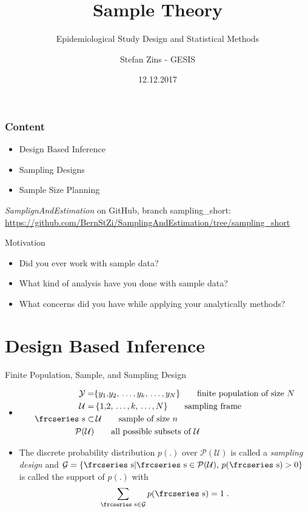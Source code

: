 \documentclass{beamer}\usepackage[]{graphicx}\usepackage[]{color}
\title{Sample Theory}
\subtitle{Epidemiological Study Design and Statistical Methods}
\author{Stefan Zins - GESIS}
\date{12.12.2017}
\newcommand{\eqname}[1]{\tag*{#1}} %
\newcommand{\textfrc}[1]{{\frcseries#1}}
\newcommand{\mathfrc}[1]{\text{\textfrc{#1}}}
\begin{document}
\gesismaketitle %

\begin{frame}%
  \frametitle{Content}
  
  \begin{itemize}
  \item Design Based Inference
  \item Sampling Designs
  \item Sample Size Planning
  \end{itemize}


\emph{SamplignAndEstimation} on GitHub, branch sampling\_short:
\url{https://github.com/BernStZi/SamplingAndEstimation/tree/sampling_short}
\end{frame}


\begin{frame}{Motivation}
 \begin{itemize}
    \item<1,4>  Did you ever work with sample data? 
    \item<2,4> What kind of analysis have you done with sample data?
    \item<3,4>  What concerns did you have while applying your analytically methods?
  \end{itemize}
\end{frame}



\section{Design Based Inference}



\begin{frame}{\alert{Finite} Population, Sample, and Sampling Design}

 \begin{itemize}
 \item[] 
 \begin{align}
 \mathcal{Y} = & \{ y_1{,}y_2{,}\,\ldots{,}\,y_k{,}\,\ldots{,}\,y_N \} \eqname{finite population of size $N$} \\
 \mathcal{U} = &\, \{ 1{,}2{,}\,\ldots{,}\,k{,}\,\ldots{,}\,N \} \eqname{sampling frame} \\
 \mathfrc{s} \subset &\, \mathcal{U} \eqname{sample of size $n$} \\
 \mathcal{P}(\mathcal{U}) & \eqname{all possible subsets of $\mathcal{U}$}
 \end{align}
 \item[] The discrete probability distribution $p(.)$ over $\mathcal{P}(\mathcal{U})$ is called a \emph{sampling design} and  $\mathcal{G}=\{ \mathfrc{s} | \mathfrc{s} \in \mathcal{P}(\mathcal{U}),\, p(\mathfrc{s}) > 0 \}$ is called the support of $p(.)$ with
$$
\sum_{\mathfrc{s} \in \mathcal{G}} p(\mathfrc{s}) = 1\;.
$$
 \end{itemize}
\end{frame}
\end{document}
